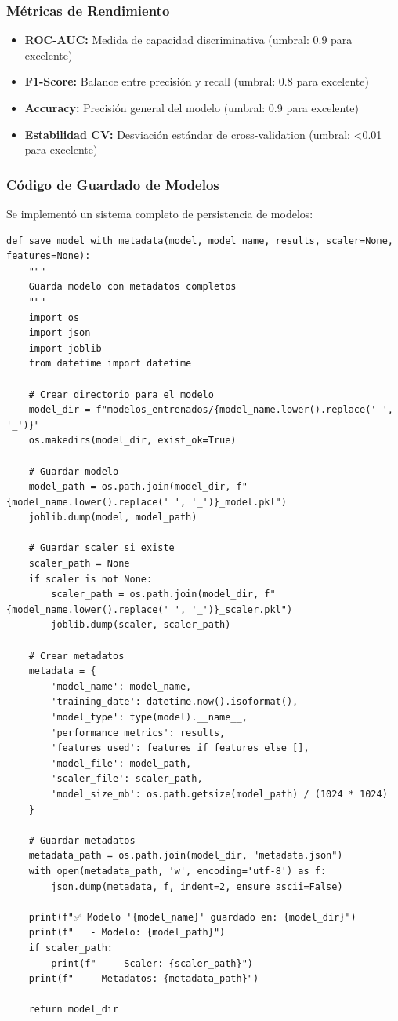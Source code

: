 \documentclass[12pt,letterpaper]{article}
\begin{document}
\subsubsection{Métricas de Rendimiento}
\begin{itemize}
    \item \textbf{ROC-AUC:} Medida de capacidad discriminativa (umbral: 0.9 para excelente)
    \item \textbf{F1-Score:} Balance entre precisión y recall (umbral: 0.8 para excelente)
    \item \textbf{Accuracy:} Precisión general del modelo (umbral: 0.9 para excelente)
    \item \textbf{Estabilidad CV:} Desviación estándar de cross-validation (umbral: <0.01 para excelente)
\end{itemize}

\subsubsection{Código de Guardado de Modelos}

Se implementó un sistema completo de persistencia de modelos:

\begin{verbatim}
def save_model_with_metadata(model, model_name, results, scaler=None, features=None):
    """
    Guarda modelo con metadatos completos
    """
    import os
    import json
    import joblib
    from datetime import datetime
    
    # Crear directorio para el modelo
    model_dir = f"modelos_entrenados/{model_name.lower().replace(' ', '_')}"
    os.makedirs(model_dir, exist_ok=True)
    
    # Guardar modelo
    model_path = os.path.join(model_dir, f"{model_name.lower().replace(' ', '_')}_model.pkl")
    joblib.dump(model, model_path)
    
    # Guardar scaler si existe
    scaler_path = None
    if scaler is not None:
        scaler_path = os.path.join(model_dir, f"{model_name.lower().replace(' ', '_')}_scaler.pkl")
        joblib.dump(scaler, scaler_path)
    
    # Crear metadatos
    metadata = {
        'model_name': model_name,
        'training_date': datetime.now().isoformat(),
        'model_type': type(model).__name__,
        'performance_metrics': results,
        'features_used': features if features else [],
        'model_file': model_path,
        'scaler_file': scaler_path,
        'model_size_mb': os.path.getsize(model_path) / (1024 * 1024)
    }
    
    # Guardar metadatos
    metadata_path = os.path.join(model_dir, "metadata.json")
    with open(metadata_path, 'w', encoding='utf-8') as f:
        json.dump(metadata, f, indent=2, ensure_ascii=False)
    
    print(f"✅ Modelo '{model_name}' guardado en: {model_dir}")
    print(f"   - Modelo: {model_path}")
    if scaler_path:
        print(f"   - Scaler: {scaler_path}")
    print(f"   - Metadatos: {metadata_path}")
    
    return model_dir
\end{verbatim}
\end{document}
